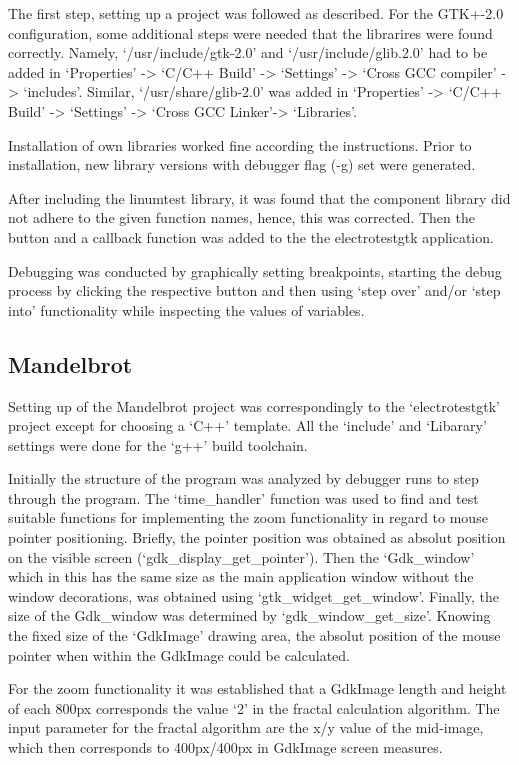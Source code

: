 \documentclass[a4paper,11pt,twoside]{article}
\begin{document}
The first step, setting up a project was followed as described. For the GTK+-2.0
configuration, some additional steps were needed that the librarires were found
correctly. Namely, `/usr/include/gtk-2.0' and `/usr/include/glib.2.0' had to be
added in `Properties' -> `C/C++ Build' -> `Settings' ->  `Cross GCC compiler' ->
`includes'. Similar, `/usr/share/glib-2.0' was added in `Properties' -> `C/C++
Build' ->  `Settings' -> `Cross GCC Linker'-> `Libraries'.

Installation of own libraries worked fine according the instructions. Prior to
installation, new library versions with debugger flag (-g) set were generated.

After including the linumtest library, it was found that the component library
did not adhere to the given function names, hence, this was corrected. Then
the button and a callback function was added to the the electrotestgtk application.

Debugging was conducted by graphically setting breakpoints, starting the debug
process by clicking the respective button and then using `step over' and/or
`step into' functionality while inspecting the values of variables.

\subsection{Mandelbrot}
Setting up of the Mandelbrot project was correspondingly to the `electrotestgtk'
project except for choosing a `C++' template. All the `include' and `Libarary'
settings were done for the `g++' build toolchain.

Initially the structure of the program was analyzed by debugger runs to step
through the program. The `time\_handler' function was used to find and test
suitable functions for implementing the zoom functionality in regard to mouse
pointer positioning. Briefly, the pointer position was obtained as absolut
position on the visible screen (`gdk\_display\_get\_pointer'). Then the `Gdk\_window'
which in this has the same size as the main application window without the
window decorations, was obtained using `gtk\_widget\_get\_window'. Finally, the
size of the Gdk\_window was determined by `gdk\_window\_get\_size'. Knowing the
fixed size of the `GdkImage' drawing area, the absolut position of the mouse
pointer when within the GdkImage could be calculated.

For the zoom functionality it was established that a GdkImage length and height
of each 800px corresponds the value `2' in the fractal calculation algorithm. The
input parameter for the fractal algorithm are the x/y value of the mid-image, which
then corresponds to 400px/400px in GdkImage screen measures.
\end{document}

